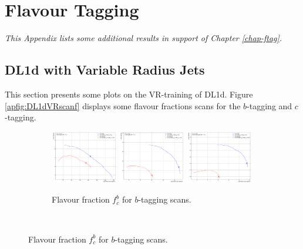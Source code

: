 \chapter{Flavour Tagging}
\textit{This Appendix lists some additional results in support of Chapter \ref{chap-ftag}.}

\section{DL1d with Variable Radius Jets}\label{ap-DL1dVR}
This section presents some plots on the VR-training of DL1d. Figure \ref{apfig:DL1dVRscanf} displays some flavour fractions scans for the $b$-tagging and $c$-tagging. 

\begin{figure}[h!]
  \centering
  \begin{subfigure}[b]{\textwidth}
      \centering
      \includegraphics[width=0.32\textwidth]{Images/FTAG/VRDL1d/scansfraction/thesis_plot_frac/contour_fraction_ttbar_200.pdf}
      \includegraphics[width=0.32\textwidth]{Images/FTAG/VRDL1d/scansfraction/thesis_plot_frac/contour_fraction_zpext_200.pdf}
      \includegraphics[width=0.32\textwidth]{Images/FTAG/VRDL1d/scansfraction/thesis_plot_frac/contour_fraction_graviton_200.pdf}
      \caption{Flavour fraction $f_c^b$ for $b$-tagging scans.} 
      \label{fig:DL1dVRscanfb}
  \end{subfigure}\\

\end{figure}
